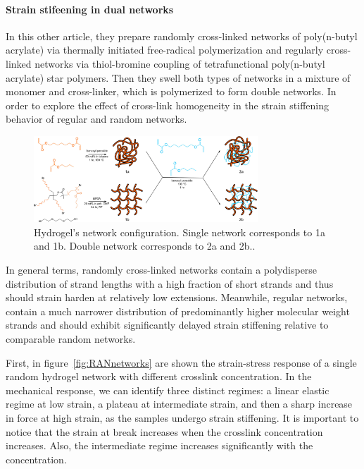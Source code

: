 \paragraph{Strain stifeening in dual networks}
In this other article\citep{kongEffectCrossLinkHomogeneity2024}, they prepare randomly cross-linked networks of poly(n-butyl acrylate) via thermally initiated free-radical polymerization and regularly cross-linked networks via thiol-bromine coupling of tetrafunctional poly(n-butyl acrylate) star polymers. 
Then they swell both types of networks in a mixture of monomer and cross-linker, which is polymerized to form double networks.
In order to explore the effect of cross-link homogeneity in the strain stiffening behavior of regular and random networks.

\begin{figure}[ht!]
    \centering
    \includegraphics[width=0.75\textwidth]{figs/explainMechResponse/RAN-REG-networks.jpeg}
    \caption{Hydrogel's network configuration.
        Single network corresponds to 1a and 1b. 
        Double network corresponds to 2a and 2b.\citep{kongEffectCrossLinkHomogeneity2024}.}\label{fig:RANREGnetworks}
\end{figure}

In general terms, randomly cross-linked networks contain a polydisperse distribution of strand lengths with a high fraction of short strands and thus should strain harden at relatively low extensions. 
Meanwhile, regular networks, contain a much narrower distribution of predominantly higher molecular weight strands and should exhibit significantly delayed strain stiffening relative to comparable random networks.

First, in figure~\ref{fig:RANnetworks} are shown the strain-stress response of a single random hydrogel network with different crosslink concentration.
In the mechanical response, we can identify three distinct regimes: a linear elastic regime at low strain, a plateau at intermediate strain, and then a sharp increase in force at high strain, as the samples undergo strain stiffening.
It is important to notice that the strain at break increases when the crosslink concentration increases.
Also, the intermediate regime increases significantly with the concentration.

